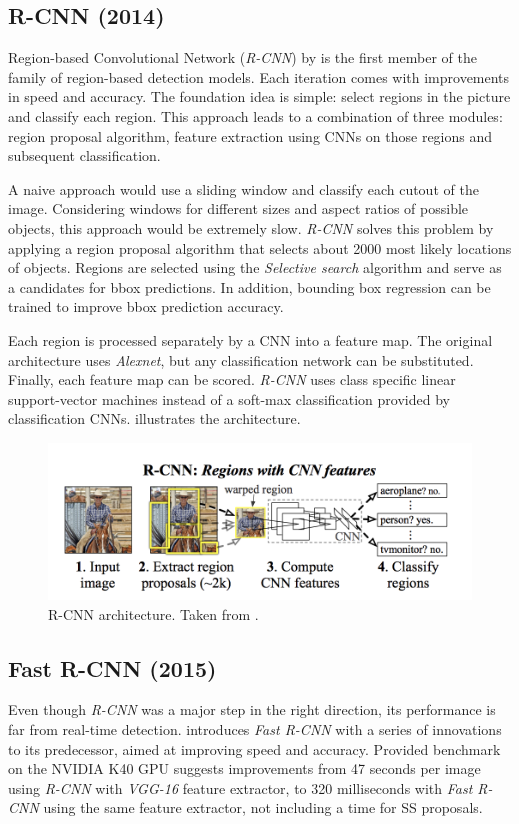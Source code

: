 \subsection{R-CNN (2014)}
Region-based Convolutional Network (\textit{R-CNN}) by \citeauthor{bib:rcnn} \cite{bib:rcnn} is the first member of the family of region-based detection models. Each iteration comes with improvements in speed and accuracy. The foundation idea is simple: select regions in the picture and classify each region. This approach leads to a combination of three modules: region proposal algorithm, feature extraction using CNNs on those regions and subsequent classification. 

A naive approach would use a sliding window and classify each cutout of the image. Considering windows for different sizes and aspect ratios of possible objects, this approach would be extremely slow. \textit{R-CNN} solves this problem by applying a region proposal algorithm that selects about 2000 most likely locations of objects. Regions are selected using the \textit{Selective search} \cite{bib:selectivesearch} algorithm and serve as a candidates for bbox predictions. In addition, bounding box regression can be trained to improve bbox prediction accuracy.

Each region is processed separately by a CNN into a feature map. The original architecture uses \textit{Alexnet}, but any classification network can be substituted. Finally, each feature map can be scored. \textit{R-CNN} uses class specific linear support-vector machines instead of a soft-max classification provided by classification CNNs.  illustrates the architecture.

\begin{figure}
    \centering
    \includegraphics[width=\textwidth]{img/rcnn}
    \caption{R-CNN architecture. Taken from \cite[fig. 1]{bib:rcnn}.}
    \label{fig:rcnn}
\end{figure}

\subsection{Fast R-CNN (2015)}
Even though \textit{R-CNN} was a major step in the right direction, its performance is far from real-time detection. \citeauthor{bib:fastrcnn} \cite{bib:fastrcnn} introduces \textit{Fast R-CNN} with a series of innovations to its predecessor, aimed at improving speed and accuracy. Provided benchmark on the NVIDIA K40 GPU suggests improvements from 47 seconds per image using \textit{R-CNN} with \textit{VGG-16} feature extractor, to 320 milliseconds with \textit{Fast R-CNN} using the same feature extractor, not including a time for SS proposals. 

